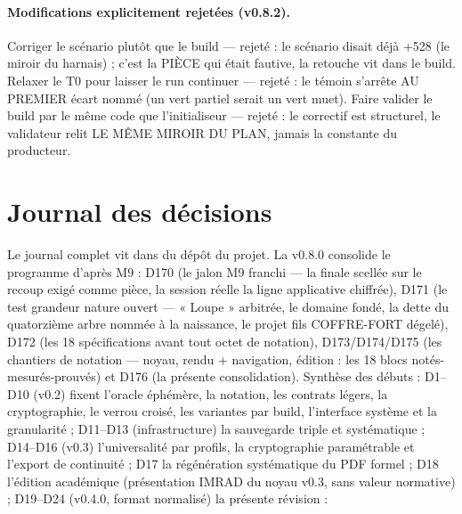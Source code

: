 \paragraph{Modifications explicitement rejetées (v0.8.2).} Corriger le
scénario plutôt que le build — rejeté : le scénario disait déjà +528 (le
miroir du harnais) ; c'est la PIÈCE qui était fautive, la retouche vit dans
le build. Relaxer le T0 pour laisser le run continuer — rejeté : le témoin
s'arrête AU PREMIER écart nommé (un vert partiel serait un vert muet). Faire
valider le build par le même code que l'initialiseur — rejeté : le correctif
est structurel, le validateur relit LE MÊME MIROIR DU PLAN, jamais la
constante du producteur.

\section{Journal des décisions}\label{sec:decisions}

Le journal complet vit dans  du dépôt du projet. La
v0.8.0 consolide le programme d'après M9 : D170 (le jalon M9 franchi — la finale
 scellée sur le recoup exigé comme pièce, la session réelle la ligne
applicative chiffrée), D171 (le test grandeur nature ouvert — « Loupe » arbitrée,
le domaine  fondé, la dette du quatorzième arbre nommée à la
naissance, le projet fils COFFRE-FORT dégelé), D172 (les 18 spécifications avant
tout octet de notation), D173/D174/D175 (les chantiers de notation — noyau,
rendu + navigation, édition : les 18 blocs notés-mesurés-prouvés) et D176 (la
présente consolidation). Synthèse des débuts :
D1–D10 (v0.2) fixent l'oracle éphémère, la notation, les contrats légers, la
cryptographie, le verrou croisé, les variantes par build, l'interface système et la
granularité ; D11–D13 (infrastructure) la sauvegarde triple et systématique ; D14–D16
(v0.3) l'universalité par profils, la cryptographie paramétrable et l'export de
continuité ; D17 la régénération systématique du PDF formel ; D18 l'édition académique
(présentation IMRAD du noyau v0.3, sans valeur normative) ; D19–D24 (v0.4.0, format
normalisé) la présente révision :

